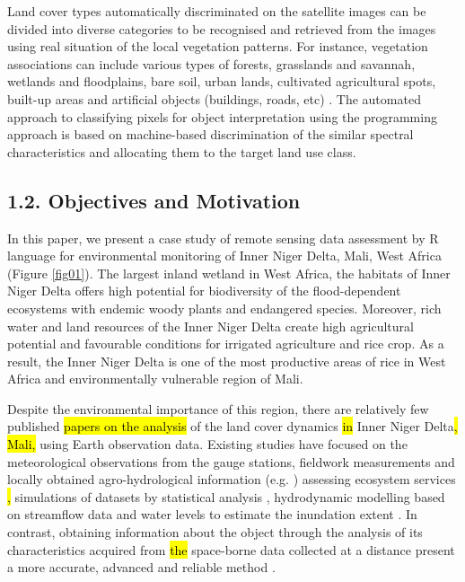 \documentclass[12pt,a4paper,oneside]{article}
\def \newpar{\vspace{6pt}}
\begin{document}
\newpar Land cover types automatically discriminated on the satellite images can be divided into diverse categories to be recognised and retrieved from the images using real situation of the local vegetation patterns. For instance, vegetation associations can include various types of forests, grasslands and savannah, wetlands and floodplains, bare soil, urban lands, cultivated agricultural spots, built-up areas and artificial objects (buildings, roads, etc) \citep{lillesand1994remote}. The automated approach to classifying pixels for object interpretation using the programming approach is based on machine-based discrimination of the similar spectral characteristics and allocating them to the target land use class.

\subsection*{1.2. Objectives and Motivation}

\newpar In this paper, we present a case study of remote sensing data assessment by R language for environmental monitoring of Inner Niger Delta, Mali, West Africa (Figure \ref{fig01}). The largest inland wetland in West Africa, the habitats of Inner Niger Delta offers high potential for biodiversity of the flood-dependent ecosystems with endemic woody plants and endangered species. Moreover, rich water and land resources of the Inner Niger Delta create high agricultural potential and favourable conditions for irrigated agriculture and rice crop. As a result, the Inner Niger Delta is one of the most productive areas of rice in West Africa and environmentally vulnerable region of Mali.

\newpar Despite the environmental importance of this region, there are relatively few published \hl{papers on the analysis} of the land cover dynamics \hl{in} Inner Niger Delta\hl{, Mali,} using Earth observation data. Existing studies have focused on the meteorological observations from the gauge stations, fieldwork measurements and locally obtained agro-hydrological information (e.g. \citep{dadson2010wetland}) assessing ecosystem services \citep{REBELO201358}\hl{, }simulations of datasets by statistical analysis \cite{Mascaro}, hydrodynamic modelling based on streamflow data and water levels to estimate the inundation extent \citep{HAQUE2020100703,HAQUE2021104187}. In contrast, obtaining information about the object through the analysis of its characteristics acquired from \hl{the }space-borne data collected at a distance present a more accurate, advanced and reliable method \citep{Maini,rs70202127}. 
\end{document}
